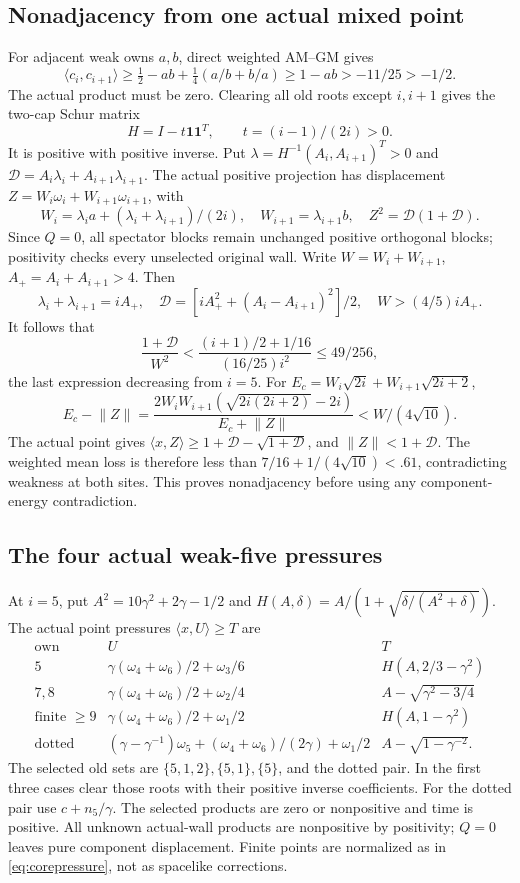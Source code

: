 \documentclass[11pt]{article}
\theoremstyle{definition}
\theoremstyle{remark}
\newcommand{\ip}[2]{\langle #1,#2\rangle}
\newcommand{\norm}[1]{\lVert #1\rVert}
\begin{document}
\subsection{Nonadjacency from one actual mixed point}
For adjacent weak owns \(a,b\), direct weighted AM--GM gives
\[
 \ip{c_i}{c_{i+1}}\geq
 \tfrac12-ab+\tfrac14(a/b+b/a)
 \geq1-ab>-11/25>-1/2.
\]
The actual product must be zero. Clearing all old roots
except \(i,i+1\) gives the two-cap Schur matrix
\[
 H=I-t\mathbf1\mathbf1^T,\qquad t=(i-1)/(2i)>0.
\]
It is positive with positive inverse. Put
\(\lambda=H^{-1}(A_i,A_{i+1})^T>0\) and
\(\mathcal D=A_i\lambda_i+A_{i+1}\lambda_{i+1}\).
The actual positive projection has displacement
\(Z=W_i\omega_i+W_{i+1}\omega_{i+1}\), with
\[
 W_i=\lambda_i a+(\lambda_i+\lambda_{i+1})/(2i),
 \quad W_{i+1}=\lambda_{i+1}b,\quad
 Z^2=\mathcal D(1+\mathcal D).
\]
Since \(Q=0\), all spectator blocks remain unchanged
positive orthogonal blocks; positivity checks every
unselected original wall.
Write \(W=W_i+W_{i+1}\), \(A_+=A_i+A_{i+1}>4\).
Then
\[
 \lambda_i+\lambda_{i+1}=iA_+,\quad
 \mathcal D=[iA_+^2+(A_i-A_{i+1})^2]/2,\quad
 W>(4/5)iA_+.
\]
It follows that
\[
 \frac{1+\mathcal D}{W^2}
 <\frac{(i+1)/2+1/16}{(16/25)i^2}
 \leq49/256,
\]
the last expression decreasing from \(i=5\).
For \(E_c=W_i\sqrt{2i}+W_{i+1}\sqrt{2i+2}\),
\[
 E_c-\norm Z=
 \frac{2W_iW_{i+1}(\sqrt{2i(2i+2)}-2i)}
      {E_c+\norm Z}<W/(4\sqrt{10}).
\]
The actual point gives
\(\ip{x}{Z}\geq1+\mathcal D-\sqrt{1+\mathcal D}\),
and \(\norm Z<1+\mathcal D\).
The weighted mean loss is therefore less than
\(7/16+1/(4\sqrt{10})<.61\), contradicting weakness
at both sites. This proves nonadjacency before using
any component-energy contradiction.

\subsection{The four actual weak-five pressures}
At \(i=5\), put \(A^2=10\gamma^2+2\gamma-1/2\) and
\(H(A,\delta)=A/(1+\sqrt{\delta/(A^2+\delta)})\).
The actual point pressures \(\ip{x}{U}\geq T\) are
\[
\begin{array}{c|l|l}
\text{own}&U&T\\ \hline
5&\gamma(\omega_4+\omega_6)/2+\omega_3/6
 &H(A,2/3-\gamma^2)\\
7,8&\gamma(\omega_4+\omega_6)/2+\omega_2/4
 &A-\sqrt{\gamma^2-3/4}\\
\text{finite }\geq9&\gamma(\omega_4+\omega_6)/2+\omega_1/2
 &H(A,1-\gamma^2)\\
\text{dotted}&(\gamma-\gamma^{-1})\omega_5+
 (\omega_4+\omega_6)/(2\gamma)+\omega_1/2
 &A-\sqrt{1-\gamma^{-2}}.
\end{array}
\]
The selected old sets are \(\{5,1,2\},\{5,1\},\{5\}\),
and the dotted pair. In the first three cases clear
those roots with their positive inverse coefficients.
For the dotted pair use \(c+n_5/\gamma\).
The selected products are zero or nonpositive and
time is positive. All unknown actual-wall products
are nonpositive by positivity; \(Q=0\) leaves pure
component displacement. Finite points are normalized
as in \eqref{eq:corepressure}, not as spacelike corrections.
\end{document}
